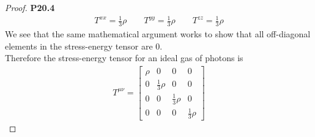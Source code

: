\documentclass[11pt]{article}
\theoremstyle{definition}
\begin{document}
\begin{proof}{\textbf{P20.4}}
\begin{align*}
    T^{xx} = \frac{1}{3}\rho
    \qquad
    T^{yy} = \frac{1}{3}\rho
    \qquad
    T^{zz} = \frac{1}{3}\rho
\end{align*}
We see that the same mathematical argument works to show that all off-diagonal
elements in the stress-energy tensor are 0.\\
Therefore the stress-energy tensor for an ideal gas of photons is
\begin{align*}
    T^{\mu\nu} = \begin{bmatrix}
        \rho & 0 & 0 & 0\\
        0 & \frac{1}{3} \rho & 0 & 0\\
        0 & 0 & \frac{1}{3} \rho & 0\\
        0 & 0 & 0 & \frac{1}{3} \rho
    \end{bmatrix}
\end{align*}
\end{proof}
\end{document}
